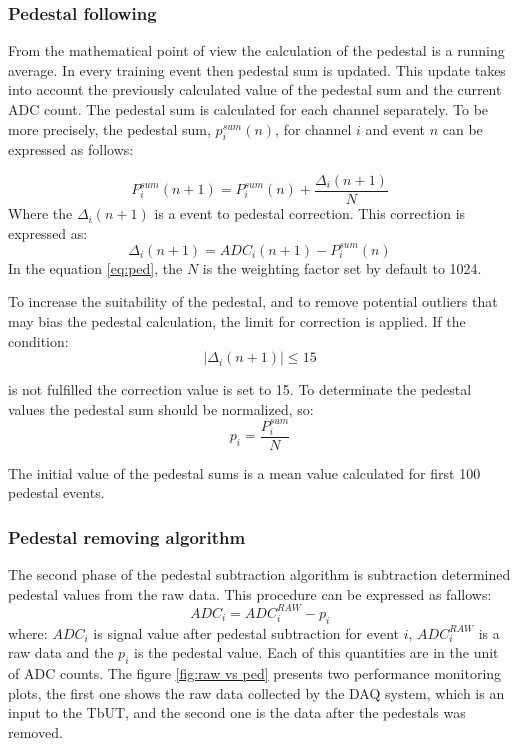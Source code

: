 \subsubsection{Pedestal following}
From the mathematical point of view the calculation of the pedestal is a running average. In every training event then pedestal sum is updated. This update takes into account the previously calculated value of the pedestal sum and the current ADC count. The pedestal sum is calculated for each channel separately. To be more precisely, the pedestal sum, $p^{sum}_i(n)$, for channel $i$ and event $n$ can be expressed as follows:

\begin{equation}
P_{i}^{sum}(n+1)=P^{sum}_{i}(n) + \frac{\Delta_{i}(n+1)}{N}
\label{eq:ped}
\end{equation}
Where the $\Delta_{i}(n+1)$ is a event to pedestal correction. This correction is expressed as:
\begin{equation}
\Delta_{i}(n+1)=ADC_{i}(n+1)-P^{sum}_{i}(n)
\end{equation}
In the equation \ref{eq:ped}, the $N$ is the weighting factor set by default to 1024. 


To increase the suitability of the pedestal, and to remove potential outliers that may bias the pedestal calculation, the limit for correction is applied. If the condition:
\begin{equation} 
\left| \Delta_{i}(n+1) \right| \leq 15  
\end{equation}

is not fulfilled the correction value is set to 15. To determinate the pedestal values the pedestal sum should be normalized, so:
\begin{equation}
p_{i}=\frac{P^{sum}_{i}}{N}
\end{equation}

The initial value of the pedestal sums is a mean value calculated for first 100 pedestal events. 

\subsubsection{Pedestal removing algorithm}
The second phase of the pedestal subtraction algorithm is subtraction determined pedestal values from the raw data. This procedure can be expressed as fallows:
\begin{equation}
ADC_{i}=ADC^{RAW}_{i}-p_{i}
\end{equation} 
where: $ADC_{i}$ is signal value after pedestal subtraction for event $i$, $ADC^{RAW}_{i}$ is a raw data and the $p_{i}$ is the pedestal value. Each of this quantities are in the unit of ADC counts. 
The figure \ref{fig:raw vs ped} presents two performance monitoring plots, the first one shows the raw data collected by the DAQ system, which is an input to the TbUT, and the second one is the data after the pedestals was removed.  


